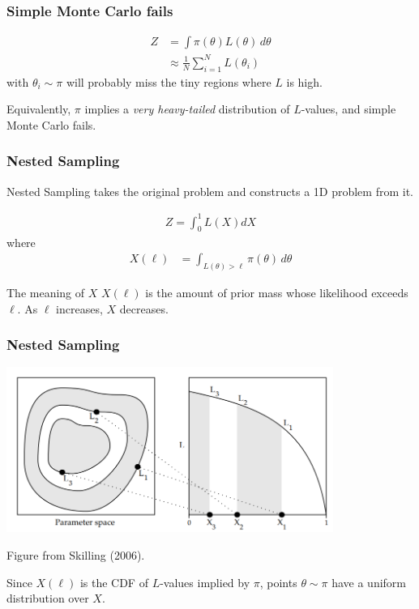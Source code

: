 \documentclass{beamer}
\begin{document}
\begin{frame}
\frametitle{Simple Monte Carlo fails}

\begin{align}
Z &= \int \pi(\theta) L(\theta) \, d\theta \\
  &\approx \frac{1}{N} \sum_{i=1}^N L(\theta_i)
\end{align}
with $\theta_i \sim \pi$ will probably miss the
tiny regions where $L$ is high.

Equivalently, $\pi$ implies a {\em very heavy-tailed}
distribution of $L$-values, and simple Monte Carlo fails.

\end{frame}


\begin{frame}
\frametitle{Nested Sampling}
Nested Sampling takes the original problem and constructs
a 1D problem from it.

\begin{align}
Z = \int_0^1 L(X) dX
\end{align}
where
\begin{align}
X(\ell) &= \int_{L(\theta) > \ell} \pi(\theta) \, d\theta
\end{align}

\begin{block}{The meaning of $X$}
$X(\ell)$ is the amount of prior mass whose likelihood exceeds
$\ell$. As $\ell$ increases, $X$ decreases.
\end{block}

\end{frame}


\begin{frame}
\frametitle{Nested Sampling}

\begin{center}
\includegraphics[width=0.8\textwidth]{skilling.png}

Figure from Skilling (2006).
\end{center}

Since $X(\ell)$ is the CDF of $L$-values implied by $\pi$,
points $\theta \sim \pi$ have a uniform distribution over $X$.

\end{frame}
\end{document}
